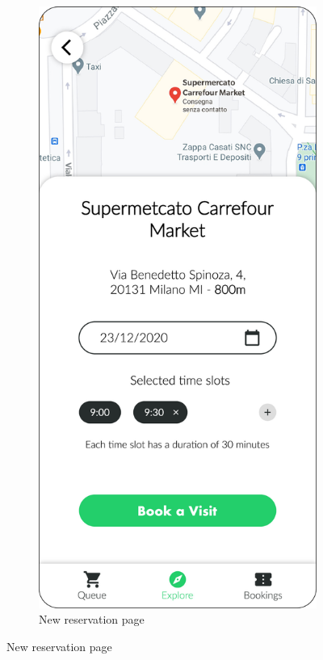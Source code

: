 \begin{figure}[H]
    \centering
    \begin{subfigure}[t]{0.28\textwidth} 
        \includegraphics{../mockups/book}
        \caption*{New reservation page}

\end{subfigure}
\end{figure}
